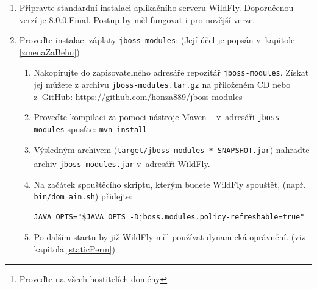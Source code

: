\begin{enumerate}
  \item Připravte standardní instalaci aplikačního serveru WildFly. Doporučenou verzí je 8.0.0.Final. Postup by měl fungovat i pro novější verze.
  
  \item Proveďte instalaci záplaty {\tt jboss-modules}: (Její účel je popsán v~kapitole \ref{zmenaZaBehu})
  \begin{enumerate}
    \item Nakopírujte do zapisovatelného adresáře repozitář {\tt jboss-modules}. Získat jej můžete z archivu {\tt jboss-modules.tar.gz} na přiloženém CD nebo z~GitHub:
      \newline\url{https://github.com/honza889/jboss-modules}
    \item Proveďte kompilaci za pomoci nástroje Maven -- v~adresáři {\tt jboss-modules} spusťte: {\tt mvn install}
    \item Výsledným archivem ({\tt target/jboss-modules-*-SNAPSHOT.jar}) nahraďte archiv {\tt jboss-modules.jar} v~adresáři WildFly.\footnote{\label{slave}Proveďte na všech hostitelích domény}
    \item Na začátek spouštěcího skriptu, kterým budete WildFly spouštět, (např. {\tt bin/dom ain.sh}) přidejte:
      \begin{lstlisting}
JAVA_OPTS="$JAVA_OPTS -Djboss.modules.policy-refreshable=true"
      \end{lstlisting}
    \item Po dalším startu by již WildFly měl používat dynamická oprávnění. (viz kapitola \ref{staticPerm})
  \end{enumerate}
  

\end{enumerate}
